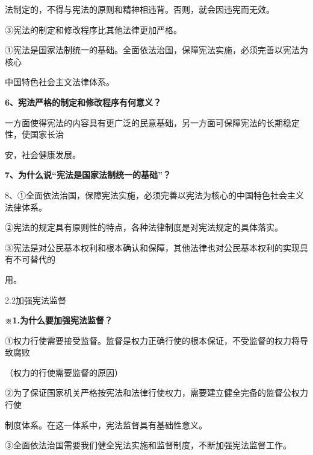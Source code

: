 \documentclass[lang=cn,11pt]{elegantbook}
\newcommand{\daofasym}[1]{{\daofasymbolfont #1}}
\newcommand{\daofasym}[1]{#1}
\begin{document}
法制定的，不得与宪法的原则和精神相违背。否则，就会因违宪而无效。\par

\daofasym{③}宪法的制定和修改程序比其他法律更加严格。\par

\daofasym{①}宪法是国家法制统一的基础。全面依法治国，保障宪法实施，必须完善以宪法为核心\par

中国特色社会主文法律体系。\par

\textbf{6、宪法严格的制定和修改程序有何意义？}\par

一方面使得宪法的内容具有更广泛的民意基础，另一方面可保障宪法的长期稳定性，使国家长治\par

安，社会健康发展。\par

\textbf{7、为什么说“宪法是国家法制统一的基础”？}\par

8、\daofasym{①}全面依法治国，保障宪法实施，必须完善以宪法为核心的中国特色社会主义法律体系。\par

\daofasym{②}宪法的规定具有原则性的特点，各种法律制度是对宪法规定的具体落实。\par

\daofasym{③}宪法是对公民基本权利和根本确认和保障，其他法律也对公民基本权利的实现具有不可替代的\par

用。\par

2.2加强宪法监督\par

\textbf{※1.为什么要加强宪法监督？}\par

\daofasym{①}权力行使需要接受监督。监督是权力正确行使的根本保证，不受监督的权力将导致腐败\par

（权力的行使需要监督的原因）\par

\daofasym{②}为了保证国家机关严格按宪法和法律行使权力，需要建立健全完备的监督公权力行使\par

制度体系。在这一体系中，宪法监督具有基础性意义。\par

\daofasym{③}全面依法治国需要我们健全宪法实施和监督制度，不断加强宪法监督工作。\par
\end{document}
